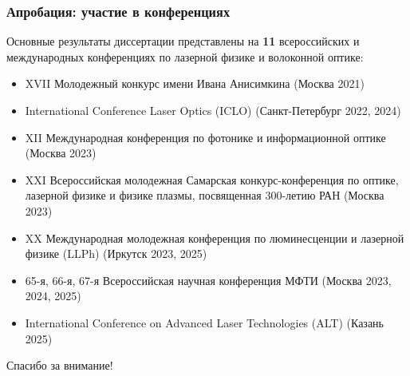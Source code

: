 \begin{frame}
    \frametitle{Апробация: участие в конференциях}
    Основные результаты диссертации представлены на \textbf{11} всероссийских и международных конференциях по лазерной физике и волоконной оптике:
    \begin{itemize}
    	\setlength{\itemsep}{0.5em}
    	\item XVII Молодежный конкурс имени Ивана Анисимкина (Москва 2021)
    	
    	\item International Conference Laser Optics (ICLO) (Санкт-Петербург 2022, 2024)
    	
    	\item XII Международная конференция по фотонике и информационной оптике (Москва 2023)
    	
    	\item XXI Всероссийская молодежная Самарская конкурс-конференция по оптике, лазерной физике и физике плазмы, посвященная 300-летию РАН (Москва 2023)
    	
    	\item XX Международная молодежная конференция по люминесценции и лазерной физике (LLPh) (Иркутск 2023, 2025)
    	
		\item 65-я, 66-я, 67-я Всероссийская научная конференция МФТИ (Москва 2023, 2024, 2025)
		
		\item International Conference on Advanced Laser Technologies (ALT) (Казань 2025)		
    \end{itemize}
\end{frame}

\begin{frame} %
    \begin{center}
        \Huge
        \centering
        Спасибо за внимание!
    \end{center}
\end{frame}

